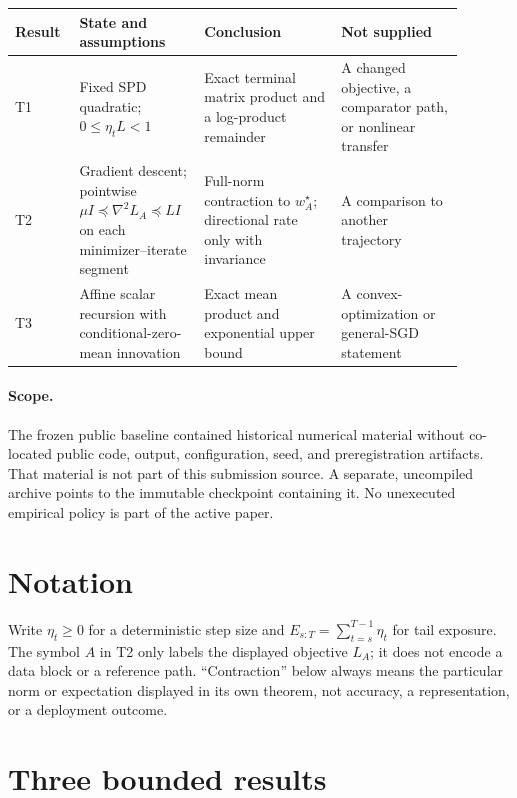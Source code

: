 \documentclass{article}
\begin{document}
\begin{center}
\small
\begingroup
\setlength{\tabcolsep}{3pt}
\begin{tabular}{p{0.12\linewidth}|p{0.23\linewidth}|p{0.29\linewidth}|p{0.25\linewidth}}
\textbf{Result} & \textbf{State and assumptions} & \textbf{Conclusion} & \textbf{Not supplied} \\
\hline
T1 & Fixed SPD quadratic; $0\leq\eta_tL<1$ & Exact terminal matrix product and a log-product remainder & A changed objective, a comparator path, or nonlinear transfer \\
T2 & Gradient descent; pointwise $\mu I\preceq\nabla^2L_A\preceq LI$ on each minimizer--iterate segment & Full-norm contraction to $w_A^\star$; directional rate only with invariance & A comparison to another trajectory \\
T3 & Affine scalar recursion with conditional-zero-mean innovation & Exact mean product and exponential upper bound & A convex-optimization or general-SGD statement
\end{tabular}
\endgroup
\end{center}

\paragraph{Scope.}
The frozen public baseline contained historical numerical material without
co-located public code, output, configuration, seed, and preregistration
artifacts. That material is not part of this submission source. A separate,
uncompiled archive points to the immutable checkpoint containing it. No
unexecuted empirical policy is part of the active paper.

\section{Notation}
\label{sec:setup}

Write $\eta_t\geq0$ for a deterministic step size and
$E_{s:T}=\sum_{t=s}^{T-1}\eta_t$ for tail exposure. The symbol $A$ in T2
only labels the displayed objective $L_A$; it does not encode a data block or
a reference path. ``Contraction'' below always means the
particular norm or expectation displayed in its own theorem, not accuracy, a
representation, or a deployment outcome.

\section{Three bounded results}
\label{sec:theory}
\end{document}
